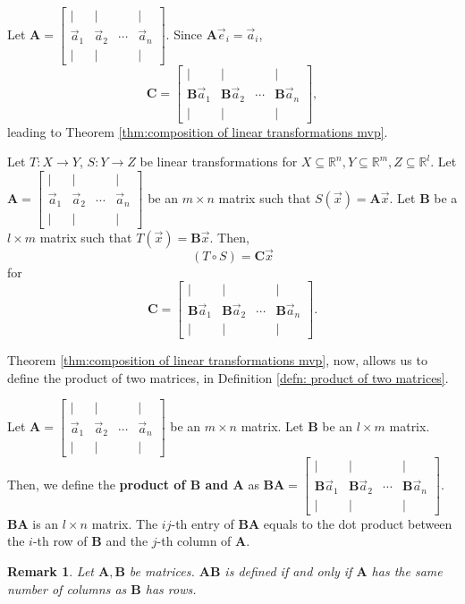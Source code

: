 \documentclass[]{book}
\newcommand{\sbvec}[1]{\ensuremath{\vec{e}_#1}}
\newcommand{\mat}[1]{\ensuremath{\mathbf{#1}}}
\newcommand{\cmat}[1][v]{\begin{bmatrix}
        \vert & \vert & & \vert \\
        \vec{#1}_1 & \vec{#1}_2 & \cdots & \vec{#1}_n \\
        \vert & \vert & & \vert
    \end{bmatrix}
}
\newcommand{\R}{\ensuremath{\mathbb{R}}}
\newtheorem*{remark}{Remark}
\begin{document}
Let $\mat{A} = \cmat[a]$. Since $\mat{A}\sbvec{i} = \vec{a}_i$, 
\[
    \mat{C} = \begin{bmatrix}\vert & \vert && \vert \\ \mat{B}\vec{a}_1 & \mat{B}\vec{a}_2 & \cdots & \mat{B}\vec{a}_n \\ \vert & \vert && \vert\end{bmatrix},
\]
leading to Theorem \ref{thm:composition of linear transformations mvp}.
\begin{theorem}
    \label{thm:composition of linear transformations mvp}
    Let $T:X \to Y$, $S:Y \to Z$ be linear transformations for $X \subseteq \R^n, Y\subseteq \R^m, Z \subseteq \R^l$. Let $\mat{A} = \cmat[a]$ be an $m \times n$ matrix such that $S(\vec{x}) = \mat{A}\vec{x}$. Let $\mat{B}$ be a $l \times m$ matrix such that $T(\vec{x}) = \mat{B} \vec{x}$. Then,
    \[(T \circ S) = \mat{C}\vec{x}\] for \[\mat{C} = \begin{bmatrix}\vert & \vert && \vert \\ \mat{B}\vec{a}_1 & \mat{B}\vec{a}_2 & \cdots & \mat{B}\vec{a}_n \\ \vert & \vert && \vert\end{bmatrix}.\]
\end{theorem}
Theorem \ref{thm:composition of linear transformations mvp}, now, allows us to define the product of two matrices, in Definition \ref{defn: product of two matrices}.
\begin{definition}
    \label{defn: product of two matrices}
    Let $\mat{A} = \cmat[a]$ be an $m \times n$ matrix. Let $\mat{B}$ be an $l \times m$ matrix. Then, we define the \textbf{product of $\pmb{\mat{B}}$ and $\pmb{\mat{A}}$} as $\mat{B}\mat{A} = \begin{bmatrix}\vert & \vert && \vert \\ \mat{B}\vec{a}_1 & \mat{B}\vec{a}_2 & \cdots & \mat{B}\vec{a}_n \\ \vert & \vert && \vert\end{bmatrix}$. $\mat{B}\mat{A}$ is an $l \times n$ matrix. The $ij$-th entry of $\mat{B}\mat{A}$ equals to the dot product between the $i$-th row of $\mat{B}$ and the $j$-th column of $\mat{A}$.
\end{definition}
\begin{remark}
    Let $\mat{A},\mat{B}$ be matrices. $\mat{AB}$ is defined if and only if $\mat{A}$ has the same number of columns as $\mat{B}$ has rows.
\end{remark}
\end{document}
